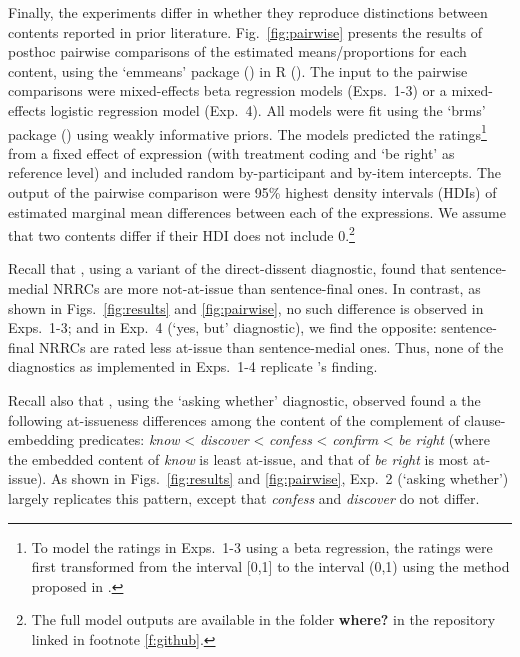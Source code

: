 \documentclass[times,linguex,xcolor]{glossa}
\begin{document}
    Finally, the experiments differ in whether they reproduce distinctions between contents reported in prior literature. Fig.~\ref{fig:pairwise} presents the results of posthoc pairwise comparisons of the estimated means/proportions for each content, using the `emmeans' package (\citealt{emmeans}) in R (\citealt{r}). The input to the pairwise comparisons were mixed-effects beta regression models (Exps.~1-3) or a mixed-effects logistic regression model (Exp.~4). All models were fit using the `brms' package (\citealt{buerkner2017}) using weakly informative priors. The models predicted the ratings\footnote{To model the ratings in Exps.~1-3 using a beta regression, the ratings were first transformed from the interval [0,1] to the interval (0,1) using the method proposed in \citealt{smithson-verkuilen2006}.} from a fixed effect of expression (with treatment coding and `be right' as reference level) and included random by-participant and by-item intercepts. The output of the pairwise comparison were 95\% highest density intervals (HDIs) of estimated marginal mean differences between each of the expressions. We assume that two contents differ if their HDI does not include 0.\footnote{The full model outputs are available in the folder {\bf where?} in the repository linked in footnote \ref{f:github}.}

    Recall that \citealt{syrett_experimental_2015}, using a variant of the direct-dissent diagnostic, found that sentence-medial NRRCs are more not-at-issue than sentence-final ones. In contrast, as shown in Figs.~\ref{fig:results} and \ref{fig:pairwise}, no such difference is observed in Exps.~1-3; and in Exp.~4 (`yes, but' diagnostic), we find the opposite: sentence-final NRRCs are rated less at-issue than sentence-medial ones. Thus, none of the diagnostics as implemented in Exps.~1-4 replicate \citeauthor{syrett_experimental_2015}’s finding.

    Recall also that
    \citealt{degen-tonhauser-glossa}, using the `asking whether' diagnostic, observed found a the following at-issueness differences among the content of the complement of clause-embedding predicates: \emph{know} < \emph{discover} < \emph{confess} < \emph{confirm} < \emph{be right} (where the embedded content of \emph{know} is least at-issue, and that of \emph{be right} is most at-issue). As shown in Figs.~\ref{fig:results} and \ref{fig:pairwise}, Exp.~2 (`asking whether') largely replicates this pattern, except that \emph{confess} and \emph{discover} do not differ.
\end{document}
